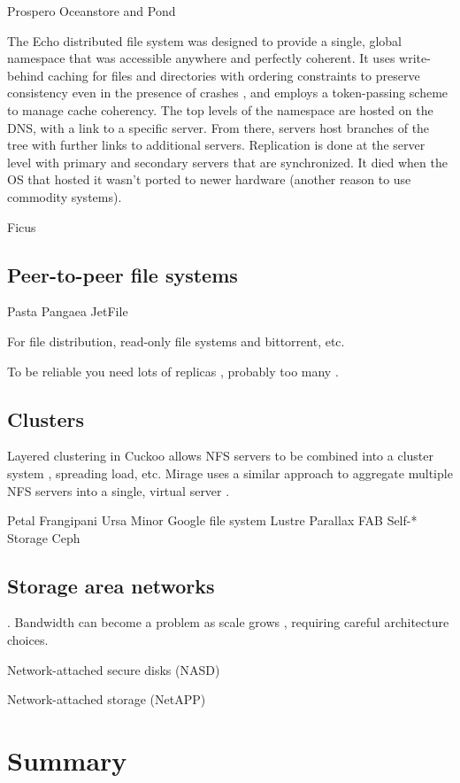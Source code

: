 Prospero \cite{neuman}
Oceanstore and Pond \cite{kubiatowicz,rhea}

The Echo distributed file system \cite{birrell93} was designed to provide a single, global namespace that was accessible anywhere and perfectly coherent. It uses write-behind caching for files and directories with ordering constraints to preserve consistency even in the presence of crashes \cite{mann}, and employs a token-passing scheme to manage cache coherency. The top levels of the namespace are hosted on the DNS, with a link to a specific server. From there, servers host branches of the tree with further links to additional servers. Replication is done at the server level with primary and secondary servers that are synchronized. It died when the OS that hosted it wasn't ported to newer hardware (another reason to use commodity systems).

Ficus \cite{popek}

\subsection{Peer-to-peer file systems}

Pasta \cite{moreton}
Pangaea \cite{saito02}
\cite{stein02}
JetFile \cite{gronvall}

For file distribution, read-only file systems \cite{fu} and bittorrent, etc.

To be reliable you need lots of replicas \cite{rabin}, probably too many \cite{blake}.

\cite{kim}\cite{mummert}\cite{sobti}

\subsection{Clusters}

\cite{amiri}

Layered clustering in Cuckoo allows NFS servers to be combined into a cluster system \cite{klosterman}, spreading load, etc. Mirage uses a similar approach to aggregate multiple NFS servers into a single, virtual server \cite{baker02}.

Petal \cite{lee95,lee96}
Frangipani \cite{thekkath}
Ursa Minor \cite{abd-el-malek}
Google file system \cite{ghemawat}
Lustre \cite{lustre}
Parallax \cite{warfield}
FAB \cite{frolund,saito04,ji}
Self-* Storage \cite{ganger}
Ceph \cite{weil}

\subsection{Storage area networks}
\cite{burns}. Bandwidth can become a problem as scale grows \cite{hospodor}, requiring careful architecture choices.

Network-attached secure disks (NASD) \cite{gibson97,gibson98a}

Network-attached storage (NetAPP) \cite{hitz}

\section{Summary}
